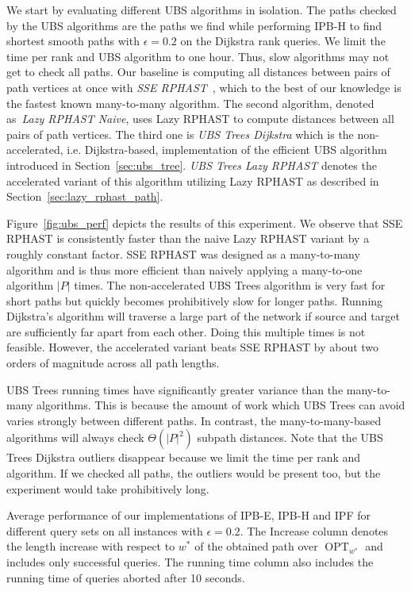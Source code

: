\documentclass[a4paper,UKenglish,cleveref, autoref, thm-restate]{lipics-v2021}
\newcommand*{\shp}{\operatorname{OPT}}
\begin{document}
We start by evaluating different UBS algorithms in isolation.
The paths checked by the UBS algorithms are the paths we find while performing IPB-H to find shortest smooth paths with $\epsilon = 0.2$ on the Dijkstra rank queries.
We limit the time per rank and UBS algorithm to one hour.
Thus, slow algorithms may not get to check all paths.
Our baseline is computing all distances between pairs of path vertices at once with \emph{SSE RPHAST}~\cite{dgw-fbspr-11}, which to the best of our knowledge is the fastest known many-to-many algorithm.
The second algorithm, denoted as~\emph{Lazy RPHAST Naive}, uses Lazy RPHAST to compute distances between all pairs of path vertices.
The third one is \emph{UBS Trees Dijkstra} which is the non-accelerated, i.e. Dijkstra-based, implementation of the efficient UBS algorithm introduced in Section~\ref{sec:ubs_tree}.
\emph{UBS Trees Lazy RPHAST} denotes the accelerated variant of this algorithm utilizing Lazy RPHAST as described in Section~\ref{sec:lazy_rphast_path}.

Figure~\ref{fig:ubs_perf} depicts the results of this experiment.
We observe that SSE RPHAST is consistently faster than the naive Lazy RPHAST variant by a roughly constant factor.
SSE RPHAST was designed as a many-to-many algorithm and is thus more efficient than naively applying a many-to-one algorithm $|P|$ times.
The non-accelerated UBS Trees algorithm is very fast for short paths but quickly becomes prohibitively slow for longer paths.
Running Dijkstra's algorithm will traverse a large part of the network if source and target are sufficiently far apart from each other.
Doing this multiple times is not feasible.
However, the accelerated variant beats SSE RPHAST by about two orders of magnitude across all path lengths.

UBS Trees running times have significantly greater variance than the many-to-many algorithms.
This is because the amount of work which UBS Trees can avoid varies strongly between different paths.
In contrast, the many-to-many-based algorithms will always check $\Theta(|P|^2)$ subpath distances.
Note that the UBS Trees Dijkstra outliers disappear because we limit the time per rank and algorithm.
If we checked all paths, the outliers would be present too, but the experiment would take prohibitively long.

\begin{table}
\centering
\caption{
Average performance of our implementations of IPB-E, IPB-H and IPF for different query sets on all instances with $\epsilon = 0.2$.
The Increase column denotes the length increase with respect to $w^*$ of the obtained path over $\shp_{w^*}$ and includes only successful queries.
The running time column also includes the running time of queries aborted after 10 seconds.
}\label{tab:data}

\end{table}
\end{document}
